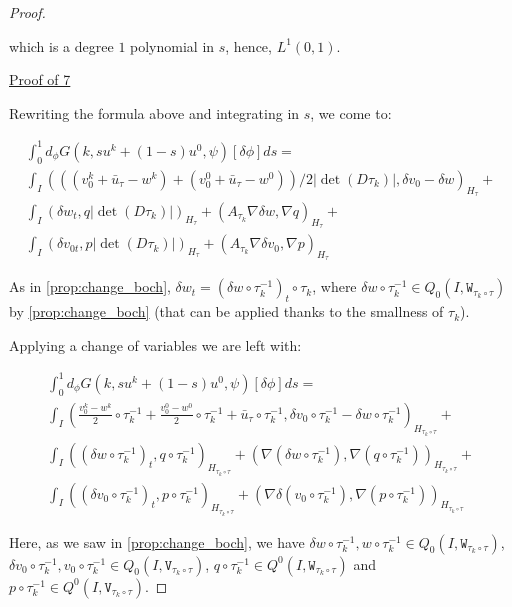 \documentclass[english,a4paper,9pt,oneside]{scrbook}	%
\theoremstyle{break}
\newenvironment{mproof}[1][\proofname]{%
  \begin{proof}[#1]$ $\par\nobreak\ignorespaces
}{%
  \end{proof}
}
\renewcommand*{\proofname}{Proof}
\theoremstyle{remark}
\newcommand{\tw}[1]{\texttt{#1}}
\begin{document}
\begin{mproof}
which is a degree $1$ polynomial in $s$, hence, $L^1(0,1)$.

\underline{Proof of 7}

Rewriting the formula above and integrating in $s$, we come to:

\begin{align*}
\int_0^1d_\phi G(k, su^k + (1-s)u^0,\psi)[\delta \phi]ds = \\
\int_I (((v_0^k+\bar{u}_\tau - w^k)+(v_0^0+\bar{u}_\tau - w^0))/2|\det(D\tau_k)|,\delta v_0-\delta w)_{H_\tau}+\\
\int_I ( \delta w_t , q |\det(D\tau_k)|)_{H_\tau}+ (A_{\tau_k}\nabla \delta w, \nabla q)_{H_\tau}+\\
\int_I ( \delta v_{0t},p |\det(D\tau_k)|)_{H_\tau} + (A_{\tau_k} \nabla \delta v_0, \nabla p)_{H_\tau}
\end{align*}

As in \cref{prop:change_boch}, $ \delta w_t  = (\delta w\circ \tau_k^{-1})_t\circ \tau_k$, where $\delta w\circ \tau_k^{-1} \in Q_0(I,\tw{W}_{\tau_k \circ \tau})$ by \cref{prop:change_boch} (that can be applied thanks to the smallness of $\tau_k$).

Applying a change of variables we are left with:

\begin{align*}
\int_0^1 d_\phi G(k, su^k + (1-s)u^0,\psi)[\delta \phi]ds = \\
\int_I \left (\frac{v_0^k-w^k}{2}\circ \tau_k^{-1}+ \frac{v_0^0-w^0}{2}\circ \tau_k^{-1}+\bar{u}_\tau\circ \tau_k^{-1} ,\delta v_0\circ \tau_k^{-1}-\delta w\circ \tau_k^{-1}\right)_{H_{\tau_k \circ \tau}}+\\
\int_I ((\delta w\circ \tau_k^{-1})_t , q\circ \tau_k^{-1} )_{H_{\tau_k \circ \tau}}+ (\nabla (\delta w\circ \tau_k^{-1}), \nabla( q\circ \tau_k^{-1}))_{H_{\tau_k \circ \tau}}+\\
\int_I ( (\delta v_{0}\circ \tau_k^{-1})_t,p \circ \tau_k^{-1})_{H_{\tau_k \circ \tau}} + ( \nabla \delta (v_0\circ \tau_k^{-1}), \nabla (p\circ \tau_k^{-1}))_{H_{\tau_k \circ \tau}}
\end{align*}

Here, as we saw in \cref{prop:change_boch}, we have $\delta w\circ \tau_k^{-1}, w\circ \tau_k^{-1} \in Q_0(I, \tw{W}_{\tau_k \circ \tau})$, $ \delta v_{0}\circ \tau_k^{-1}, v_{0}\circ \tau_k^{-1} \in Q_0(I,\tw{V}_{\tau_k \circ \tau})$, $q\circ \tau_k^{-1}\in Q^0(I, \tw{W}_{\tau_k \circ \tau})$ and $p\circ \tau_k^{-1}\in Q^0(I, \tw{V}_{\tau_k \circ \tau})$.


\end{mproof}
\end{document}
